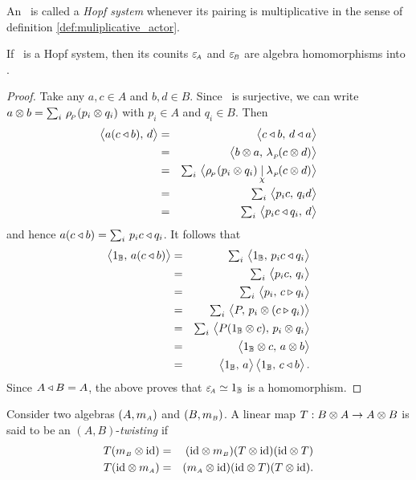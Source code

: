 \begin{defn_sec}   \label{def:Hopf_system}
An \idpa\ is called a {\em Hopf system\/} whenever its pairing is multiplicative
in the sense of definition \ref{def:muliplicative_actor}.
\end{defn_sec}


\begin{prop_sec}  \label{prop:counits_homomorphism}
If\/ \pairAB\ is a Hopf system, then its counits\/ $\varepsilon_{\scriptscriptstyle \! A}$ and\/ $\varepsilon_{\scriptscriptstyle \! B}$
are algebra homomorphisms into\/ \kk.
\end{prop_sec}

\begin{proof}
Take any $a,c\in A$ and $b,d\in B$. Since \rp\ is surjective, we can write
$a \otimes b = \sum_i \,\rho_{_{\!P}}(p_i \otimes q_i)$ with $p_i \in A$ and $q_i \in B$.
Then
\begin{eqnarray*}
      \pairM{a(c \ract b)}{d}
&=&
      \pairM{c \ract b}{d \ract a}
\\&=&
      \pairM{b \tens a}{\lp(c \tens d)}
\\&=&
      \textstyle \sum_i \,  \pairflipM{\rp(p_i \tens q_i)}{\lp(c \tens d)}
\\&=&
      \textstyle \sum_i \,  \pairM{p_i c}{q_i d}
\\&=&
      \textstyle \sum_i \,  \pairM{p_i c \ract q_i}{d}
\end{eqnarray*}
and hence $a(c \triangleleft b) = \textstyle \sum_i \,  p_i c \triangleleft q_i$. It follows that
\begin{eqnarray*}
      \pairM{1_\BB}{a(c \ract b)}
&=&
      \textstyle \sum_i \,  \pairM{1_\BB}{p_i c \ract q_i}
\\&=&
      \textstyle \sum_i \,  \pairM{p_i c}{q_i}
\\&=&
      \textstyle \sum_i \,  \pairM{p_i}{c \lact q_i}
\\&=&
      \textstyle \sum_i \,  \pairM{P}{p_i \tens (c \lact q_i)}
\\&=&
      \textstyle \sum_i \,  \pairM{P(1_\BB \tens c)}{p_i \tens q_i}
\\&=&
      \pairM{1_\BB \tens c}{a \tens b}
\\&=&
      \pairM{1_\BB}{a} \pairM{1_\BB}{c \ract b}.
\end{eqnarray*}
Since $A \triangleleft B =A$, the above proves that $\varepsilon_{\scriptscriptstyle \! A} \simeq 1_{\mathbb{B}}$ is a homomorphism.
\end{proof}



\begin{defn_sec*}   \label{def:braiding}
Consider two algebras $(A,m_{\scriptscriptstyle A})$ and $(B,m_{\scriptscriptstyle B})$.
A linear map $T : B \otimes A \rightarrow  A \otimes B$ is said to be an
$(A,B)$-{\em twisting\/} if
\begin{eqnarray*}
   T(m_{\scriptscriptstyle B} \otimes \mbox{\rm id})  &=&  (\mbox{\rm id} \otimes m_{\scriptscriptstyle B}) (T \otimes \mbox{\rm id}) (\mbox{\rm id} \otimes T)  \\
   T(\mbox{\rm id} \otimes m_{\scriptscriptstyle A})  &=&  (m_{\scriptscriptstyle A} \otimes \mbox{\rm id}) (\mbox{\rm id} \otimes T) (T \otimes \mbox{\rm id}).
\end{eqnarray*}
\end{defn_sec*}

